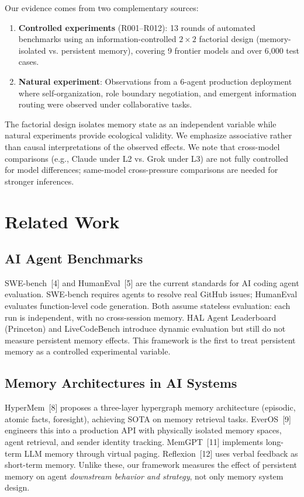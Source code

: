 \documentclass[11pt, a4paper]{article}
\begin{document}
Our evidence comes from two complementary sources:

\begin{enumerate}
  \item \textbf{Controlled experiments} (R001--R012): 13 rounds of automated benchmarks using an information-controlled $2 \times 2$ factorial design (memory-isolated vs. persistent memory), covering 9 frontier models and over 6,000 test cases.
  \item \textbf{Natural experiment}: Observations from a 6-agent production deployment where self-organization, role boundary negotiation, and emergent information routing were observed under collaborative tasks.
\end{enumerate}

The factorial design isolates memory state as an independent variable while natural experiments provide ecological validity. We emphasize associative rather than causal interpretations of the observed effects. We note that cross-model comparisons (e.g., Claude under L2 vs. Grok under L3) are not fully controlled for model differences; same-model cross-pressure comparisons are needed for stronger inferences.

\section{Related Work}

\subsection{AI Agent Benchmarks}

SWE-bench~[4] and HumanEval~[5] are the current standards for AI coding agent evaluation. SWE-bench requires agents to resolve real GitHub issues; HumanEval evaluates function-level code generation. Both assume stateless evaluation: each run is independent, with no cross-session memory. HAL Agent Leaderboard (Princeton) and LiveCodeBench introduce dynamic evaluation but still do not measure persistent memory effects. This framework is the first to treat persistent memory as a controlled experimental variable.

\subsection{Memory Architectures in AI Systems}

HyperMem~[8] proposes a three-layer hypergraph memory architecture (episodic, atomic facts, foresight), achieving SOTA on memory retrieval tasks. EverOS~[9] engineers this into a production API with physically isolated memory spaces, agent retrieval, and sender identity tracking. MemGPT~[11] implements long-term LLM memory through virtual paging. Reflexion~[12] uses verbal feedback as short-term memory. Unlike these, our framework measures the effect of persistent memory on agent \textit{downstream behavior and strategy}, not only memory system design.
\end{document}
